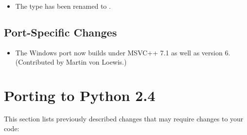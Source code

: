 \documentclass{howto}
\begin{document}
\begin{itemize}
  \item The  type has been renamed to .

\end{itemize}


\subsection{Port-Specific Changes}

\begin{itemize}

\item The Windows port now builds under MSVC++ 7.1 as well as version 6.
  (Contributed by Martin von Loewis.)

\end{itemize}



\section{Porting to Python 2.4}

This section lists previously described changes that may require
changes to your code:
\end{document}
